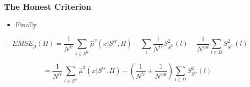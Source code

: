 \documentclass[
  shownotes,
  xcolor={svgnames},
  hyperref={colorlinks,citecolor=DarkBlue,linkcolor=DarkRed,urlcolor=DarkBlue}
  , aspectratio=169]{beamer}
\begin{document}
\begin{frame}[fragile]
\frametitle{The Honest Criterion}


\begin{itemize}
  \item Finally
\end{itemize}

\[
-EMSE_{\mu}(\Pi)=\frac{1}{N^{tr}}\sum_{i\in S^{tr}}\hat{\mu}^{2}(x|S^{tr},\Pi)-\sum_{l}\frac{1}{N^{tr}}S_{S^{tr}}^{2}\left(l\right)-\frac{1}{N^{est}}\sum_{l\in\Pi}S_{S^{tr}}^{2}\left(l\right)
\]

\[
=\frac{1}{N^{tr}}\sum_{i\in S^{tr}}\hat{\mu}^{2}(x|S^{tr},\Pi)-\left(\frac{1}{N^{tr}}+\frac{1}{N^{est}}\right)\sum_{l\in\Pi}S_{S^{tr}}^{2}\left(l\right)
\]

\end{frame}
\end{document}
